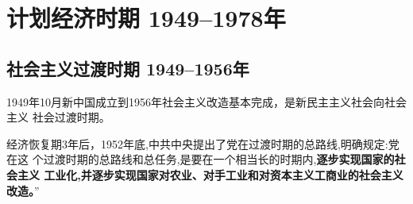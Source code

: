 \chapter{计划经济时期 1949--1978年}

\section{社会主义过渡时期 1949--1956年}
\label{sec:hongguodu}

1949年10月新中国成立到1956年社会主义改造基本完成，是新民主主义社会向社会主义
社会过渡时期。

经济恢复期3年后，1952年底,中共中央提出了党在过渡时期的总路线,明确规定:党在这
个过渡时期的总路线和总任务,是要在一个相当长的时期内,\textbf{逐步实现国家的社会主义
  工业化,并逐步实现国家对农业、对手工业和对资本主义工商业的社会主义改造。}”


